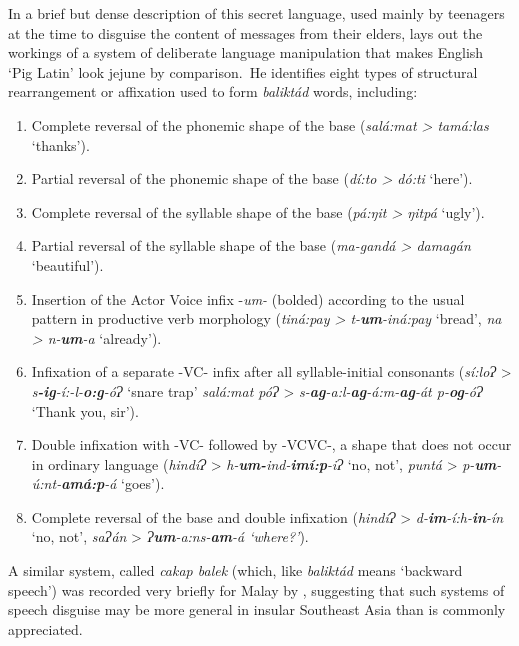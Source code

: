 \documentclass[output=paper]{langscibook}
\begin{document}
In a brief but dense description of this secret language, used mainly by teen\-ag\-ers at the time to disguise the content of messages from their elders, \citet{Conklin1956} lays out the workings of a system of deliberate language manipulation that makes English ‘Pig Latin’ look jejune by comparison.~He identifies eight types of structural rearrangement or affixation used to form \textit{baliktád}\textbf{ }words, including:

\begin{enumerate}
\item Complete reversal of the phonemic shape of the base (\textit{salá:mat > tamá:las} ‘thanks’).
\item Partial reversal of the phonemic shape of the base (\textit{dí:to > dó:ti} ‘here’).
\item Complete reversal of the syllable shape of the base (\textit{pá:ŋit > ŋitpá} ‘ugly’).
\item Partial reversal of the syllable shape of the base (\textit{ma-gandá > damagán} ‘beautiful’).
\item Insertion of the Actor Voice infix -\textit{um-} (bolded) according to the usual pattern in productive verb morphology (\textit{tiná:pay > t-}\textbf{\textit{um}}\textit{-iná:pay} ‘bread’, \textit{na > n-}\textbf{\textit{um}}\textit{-a} ‘already’).
\item Infixation of a separate -VC- infix after all syllable-initial consonants (\textit{sí:loɁ} > \textit{s}\textbf{\textit{-ig}}\textit{-í:-l-}\textbf{\textit{o:g}}\textit{-óɁ} ‘snare trap’ \textit{salá:mat póɁ} > \textit{s-}\textbf{\textit{ag}}\textit{-a:l-}\textbf{\textit{ag}}\textit{-á:m-}\textbf{\textit{ag}}\textit{-át p-}\textbf{\textit{og}}\textit{-óɁ} ‘Thank you, sir’).
\item Double infixation with -VC- followed by -VCVC-, a shape that does not occur in ordinary language (\textit{hindíɁ} > \textit{h-}\textbf{\textit{um-}}\textit{ind-}\textbf{\textit{imí:p}}\textit{-iɁ} ‘no, not’, \textit{puntá} > \textit{p-}\textbf{\textit{um}}\textit{-ú:nt-}\textbf{\textit{amá:p}}\textit{-á} ‘goes’).    
\item Complete reversal of the base and double infixation (\textit{hindíɁ} > \textit{d-}\textbf{\textit{im}}\textit{-í:h-}\textbf{\textit{in}}\textit{-ín} ‘no, not’, \textit{saɁán} > \textit{Ɂ}\textbf{\textit{um}}\textit{-a:ns-}\textbf{\textit{am}}\textit{-á ‘where?’}).
\end{enumerate}

A similar system, called \textit{cakap balek} (which, like \textit{baliktád} means ‘backward speech’) was recorded very briefly for Malay by \citet{Evans1923}, suggesting that such systems of speech disguise may be more general in insular Southeast Asia than is commonly appreciated.
\end{document}
